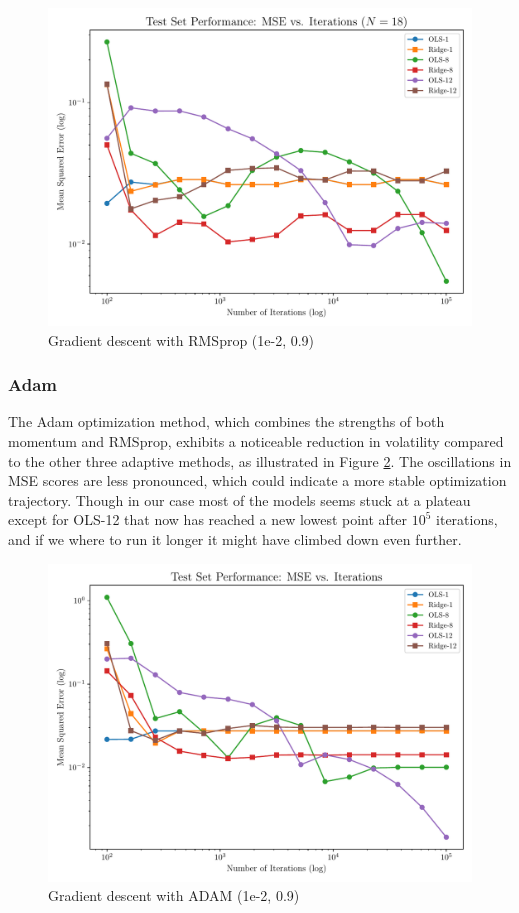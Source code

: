 \documentclass[twocolumn,aps]{revtex4}
\begin{document}
\begin{figure}[h]
    \centering
    \includegraphics[width=.95 \linewidth]{Figures/OLS_Ridge_RMSprop.pdf}
    \caption{Gradient descent with RMSprop (1e-2, 0.9)}
    \label{fig:GradRMSprop}
\end{figure}

\subsubsection{Adam}

The Adam optimization method, which combines the strengths of both momentum and RMSprop, exhibits a noticeable reduction in volatility compared to the other three adaptive methods, as illustrated in Figure \ref{fig:GradADAM}. 
The oscillations in MSE scores are less pronounced, which could indicate a more stable optimization trajectory.
Though in our case most of the models seems stuck at a plateau except for OLS-12 that now has reached a new lowest point after $10^5$ iterations, and if we where to run it longer it might have climbed down even further.
\\

\begin{figure}[h]
    \centering
    \includegraphics[width=.95 \linewidth]{Figures/OLS_Ridge_ADAM.pdf}
    \caption{Gradient descent with ADAM (1e-2, 0.9)}
    \label{fig:GradADAM}
\end{figure}
\end{document}
